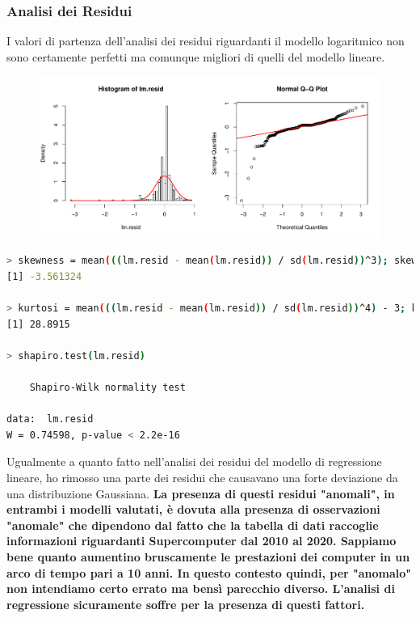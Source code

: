 \documentclass[11pt,a4paper]{article}
\begin{document}
\subsubsection{Analisi dei Residui}
I valori di partenza dell'analisi dei residui riguardanti il modello
logaritmico non sono certamente perfetti ma comunque migliori di quelli del
modello lineare.
\begin{figure}[H]
	\hspace{-1.5cm}
	\includegraphics[scale=0.7]{imgs/residuals_log.pdf}
\end{figure}
\vspace{-0.8cm}
\begin{lstlisting}[language=bash,basicstyle=\tiny,tabsize=2,frame = single]
> skewness = mean(((lm.resid - mean(lm.resid)) / sd(lm.resid))^3); skewness
[1] -3.561324

> kurtosi = mean(((lm.resid - mean(lm.resid)) / sd(lm.resid))^4) - 3; kurtosi
[1] 28.8915

> shapiro.test(lm.resid)

	Shapiro-Wilk normality test

data:  lm.resid
W = 0.74598, p-value < 2.2e-16
\end{lstlisting}
Ugualmente a quanto fatto nell'analisi dei residui del modello di regressione
lineare, ho rimosso una parte dei residui che causavano una forte deviazione da
una distribuzione Gaussiana. \textbf{La presenza di questi residui "anomali", in
entrambi i modelli valutati, \`e dovuta alla presenza di osservazioni "anomale"
che dipendono dal fatto che la tabella di dati raccoglie informazioni
riguardanti Supercomputer dal 2010 al 2020. Sappiamo bene quanto aumentino
bruscamente le prestazioni dei computer in un arco di tempo pari a 10 anni. In
questo contesto quindi, per "anomalo" non intendiamo certo errato ma bens\`i
parecchio diverso. L'analisi di regressione sicuramente soffre per la presenza
di questi fattori.}
\end{document}
